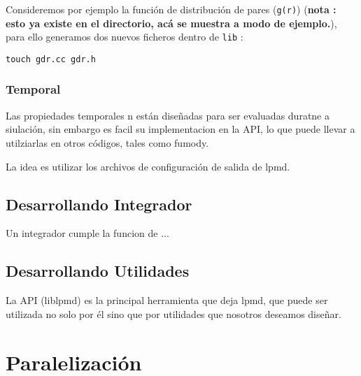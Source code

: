 \documentclass[a4paper,10pt]{scrbook}
\begin{document}
Consideremos por ejemplo la funci\'on de distribuci\'on de pares (\verb|g(r)|) (\textbf{nota : esto ya existe en el directorio, ac\'a se muestra a modo de ejemplo.}), para ello generamos dos nuevos ficheros dentro de \verb|lib| :

\begin{center}
 \verb|touch gdr.cc gdr.h|
\end{center}

\subsection{Temporal}

Las propiedades temporales n est\'an dise\~nadas para ser evaluadas duratne a siulaci\'on, sin embargo es facil su implementacion en la API, lo que puede llevar a utilziarlas en otros c\'odigos, tales como fumody.

La idea es utilizar los archivos de configuraci\'on de salida de lpmd.

\section{Desarrollando Integrador}

Un integrador cumple la funcion de ...

\section{Desarrollando Utilidades}

La API (liblpmd) es la principal herramienta que deja lpmd, que puede ser utilizada no solo por \'el sino que por utilidades que nosotros deseamos dise\~nar.


\chapter{Paralelizaci\'on}
\end{document}
